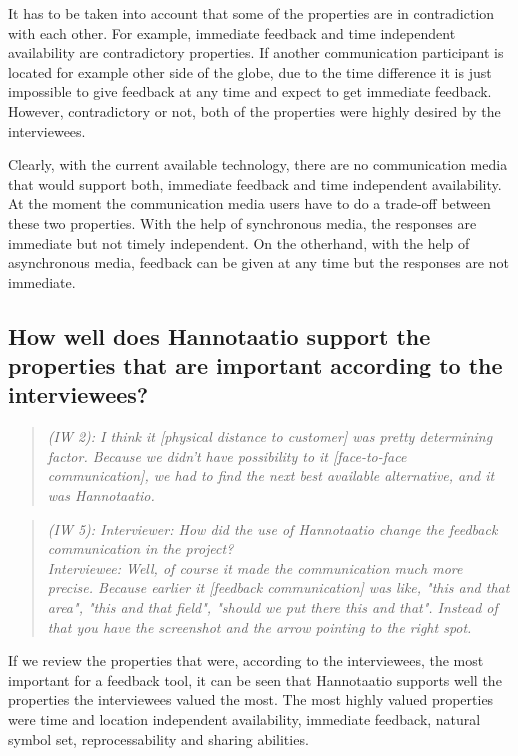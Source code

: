 \documentclass[english,12pt,a4paper,pdftex]{article}
\newcommand{\q}[2]{
\begin{quote}
\emph{(IW #1): #2}
\end{quote}}
\begin{document}
It has to be taken into account that some of the properties are in contradiction with each other. For example, immediate feedback and time independent availability are contradictory properties. If another communication participant is located for example other side of the globe, due to the time difference it is just impossible to give feedback at any time and expect to get immediate feedback. However, contradictory or not, both of the properties were highly desired by the interviewees.

Clearly, with the current available technology, there are no communication media that would support both, immediate feedback and time independent availability. At the moment the communication media users have to do a trade-off between these two properties. With the help of synchronous media, the responses are immediate but not timely independent. On the otherhand, with the help of asynchronous media, feedback can be given at any time but the responses are not immediate.

\subsection{How well does Hannotaatio support the properties that are important according to the interviewees?}

\q{2}{I think it [physical distance to customer] was pretty determining factor. Because we didn't have possibility to it [face-to-face communication], we had to find the next best available alternative, and it was Hannotaatio.}

\q{5}{Interviewer: How did the use of Hannotaatio change the feedback communication in the project? \\ Interviewee: Well, of course it made the communication much more precise. Because earlier it [feedback communication] was like, "this and that area", "this and that field", "should we put there this and that". Instead of that you have the screenshot and the arrow pointing to the right spot.}

If we review the properties that were, according to the interviewees, the most important for a feedback tool, it can be seen that Hannotaatio supports well the properties the interviewees valued the most. The most highly valued properties were time and location independent availability, immediate feedback, natural symbol set, reprocessability and sharing abilities. 
\end{document}
